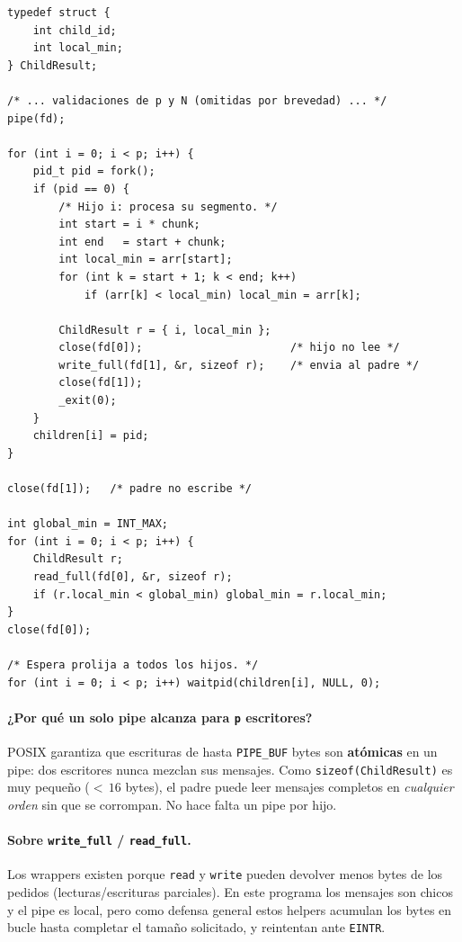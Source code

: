 \documentclass[11pt,a4paper]{article}
\begin{document}
\begin{lstlisting}[style=cstyle]
typedef struct {
    int child_id;
    int local_min;
} ChildResult;

/* ... validaciones de p y N (omitidas por brevedad) ... */
pipe(fd);

for (int i = 0; i < p; i++) {
    pid_t pid = fork();
    if (pid == 0) {
        /* Hijo i: procesa su segmento. */
        int start = i * chunk;
        int end   = start + chunk;
        int local_min = arr[start];
        for (int k = start + 1; k < end; k++)
            if (arr[k] < local_min) local_min = arr[k];

        ChildResult r = { i, local_min };
        close(fd[0]);                       /* hijo no lee */
        write_full(fd[1], &r, sizeof r);    /* envia al padre */
        close(fd[1]);
        _exit(0);
    }
    children[i] = pid;
}

close(fd[1]);   /* padre no escribe */

int global_min = INT_MAX;
for (int i = 0; i < p; i++) {
    ChildResult r;
    read_full(fd[0], &r, sizeof r);
    if (r.local_min < global_min) global_min = r.local_min;
}
close(fd[0]);

/* Espera prolija a todos los hijos. */
for (int i = 0; i < p; i++) waitpid(children[i], NULL, 0);
\end{lstlisting}

\paragraph{¿Por qué un solo pipe alcanza para \texttt{p} escritores?}
POSIX garantiza que escrituras de hasta \texttt{PIPE\_BUF} bytes son
\textbf{atómicas} en un pipe: dos escritores nunca mezclan sus
mensajes. Como \texttt{sizeof(ChildResult)} es muy pequeño
($<\,16$ bytes), el padre puede leer mensajes completos en
\emph{cualquier orden} sin que se corrompan. No hace falta un pipe
por hijo.

\paragraph{Sobre \texttt{write\_full} / \texttt{read\_full}.}
Los wrappers existen porque \texttt{read} y \texttt{write} pueden
devolver menos bytes de los pedidos (lecturas/escrituras parciales).
En este programa los mensajes son chicos y el pipe es local, pero como
defensa general estos helpers acumulan los bytes en bucle hasta
completar el tamaño solicitado, y reintentan ante \texttt{EINTR}.
\end{document}
